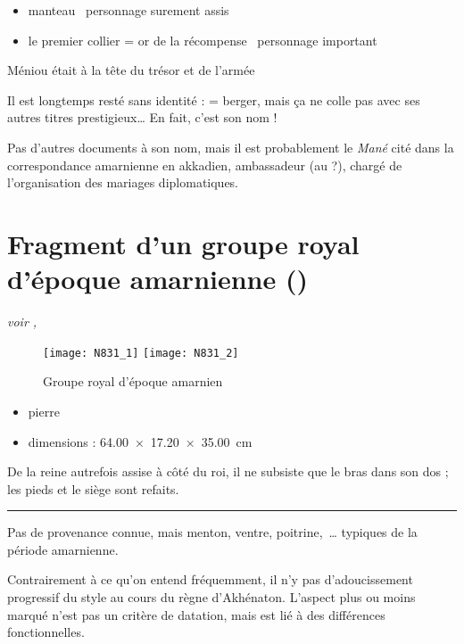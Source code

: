 \documentclass[dvipsnames,a4paper,twoside,10pt,openany,article]{memoir}
\newcommand{\separation}{%
  {\noi\hspace*{\fill}\rule{.33\textwidth}{1pt}\hspace*{\fill}}%
}
\begin{document}
\begin{itemize}
  \item manteau \donc~personnage surement assis
  \item le premier collier = or de la récompense \donc~personnage 
        important
\end{itemize}

Méniou était à la tête du trésor et de l'armée

Il est longtemps resté sans identité :  = berger, 
mais ça ne colle pas avec ses autres titres prestigieux\dots 
En fait, c'est son nom !

Pas d'autres documents à son nom, mais il est probablement le 
\emph{Mané} cité dans la correspondance amarnienne en akkadien, 
ambassadeur (au \Mtn ?), chargé de l'organisation des mariages 
diplomatiques.


\chapter{Fragment d'un groupe royal d'époque amarnienne ()}
\label{sec:N831}

\puceb{} \emph{voir , }
\bigskip

\begin{figure}[!h]
  \texttt{[image: N831\_1]}%
  \quad%
  \texttt{[image: N831\_2]}%
  \caption{Groupe royal d'époque amarnien }
  \label{fig:N831}
\end{figure}

\begin{itemize}
  \item pierre
  \item dimensions : \SI{64.00x17.20x35.00}{\cm}
\end{itemize}

De la reine autrefois assise à côté du roi, il ne subsiste que le bras 
dans son dos ; les pieds et le siège sont refaits.

\separation

Pas de provenance connue, mais menton, ventre, poitrine,~\dots{} 
typiques de la période amarnienne.

Contrairement à ce qu'on entend fréquemment, il n'y pas 
d'adoucissement progressif du style au cours du règne d'Akhénaton. 
L'aspect plus ou moins marqué n'est pas un critère de datation, mais 
est lié à des différences fonctionnelles.
\end{document}
